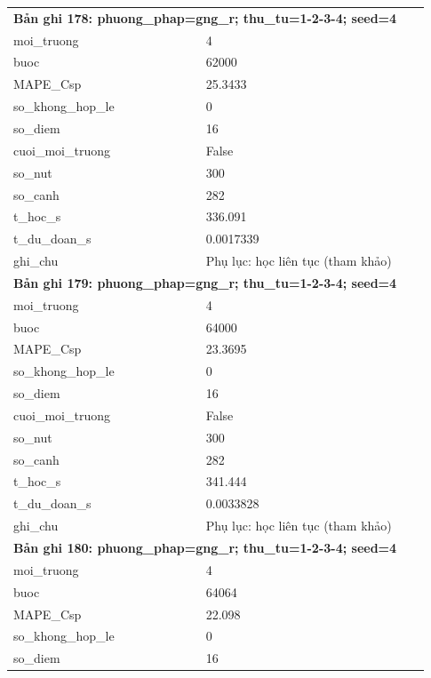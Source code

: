 \begin{longtable}{p{0.43\linewidth}p{0.50\linewidth}}
\midrule
\multicolumn{2}{p{0.95\linewidth}}{\textbf{Bản ghi 178: phuong\_phap=gng\_r; thu\_tu=1-2-3-4; seed=4}} \\
moi\_\allowbreak truong & 4 \\
buoc & 62000 \\
MAPE\_\allowbreak Csp & 25.3433 \\
so\_\allowbreak khong\_\allowbreak hop\_\allowbreak le & 0 \\
so\_\allowbreak diem & 16 \\
cuoi\_\allowbreak moi\_\allowbreak truong & False \\
so\_\allowbreak nut & 300 \\
so\_\allowbreak canh & 282 \\
t\_\allowbreak hoc\_\allowbreak s & 336.091 \\
t\_\allowbreak du\_\allowbreak doan\_\allowbreak s & 0.0017339 \\
ghi\_\allowbreak chu & Phụ lục: học liên tục (tham khảo) \\
\midrule
\multicolumn{2}{p{0.95\linewidth}}{\textbf{Bản ghi 179: phuong\_phap=gng\_r; thu\_tu=1-2-3-4; seed=4}} \\
moi\_\allowbreak truong & 4 \\
buoc & 64000 \\
MAPE\_\allowbreak Csp & 23.3695 \\
so\_\allowbreak khong\_\allowbreak hop\_\allowbreak le & 0 \\
so\_\allowbreak diem & 16 \\
cuoi\_\allowbreak moi\_\allowbreak truong & False \\
so\_\allowbreak nut & 300 \\
so\_\allowbreak canh & 282 \\
t\_\allowbreak hoc\_\allowbreak s & 341.444 \\
t\_\allowbreak du\_\allowbreak doan\_\allowbreak s & 0.0033828 \\
ghi\_\allowbreak chu & Phụ lục: học liên tục (tham khảo) \\
\midrule
\multicolumn{2}{p{0.95\linewidth}}{\textbf{Bản ghi 180: phuong\_phap=gng\_r; thu\_tu=1-2-3-4; seed=4}} \\
moi\_\allowbreak truong & 4 \\
buoc & 64064 \\
MAPE\_\allowbreak Csp & 22.098 \\
so\_\allowbreak khong\_\allowbreak hop\_\allowbreak le & 0 \\
so\_\allowbreak diem & 16 \\

\end{longtable}
